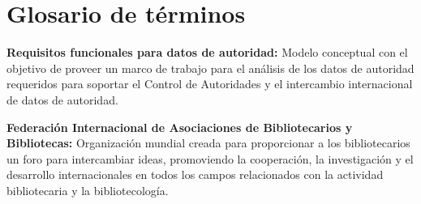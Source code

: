 \renewcommand{\appendixname}{\large Anexo}
\appendix

\chapter{\large Glosario de términos}
\pagestyle{fancy}
\lhead{}
\chead{}
\rhead{}
\lfoot{}
\cfoot{}
\rfoot{\thepage}
\renewcommand{\headrulewidth}{0.4pt}
\vspace{-1cm}

\textbf{Requisitos funcionales para datos de autoridad:} Modelo conceptual con el objetivo de proveer un marco de trabajo para el análisis de los datos de autoridad requeridos para soportar el Control de Autoridades y el intercambio internacional de datos de autoridad.

\textbf{Federación Internacional de Asociaciones de Bibliotecarios y Bibliotecas:} Organización mundial creada para proporcionar a los bibliotecarios un foro para intercambiar ideas, promoviendo la cooperación, la investigación y el desarrollo internacionales en todos los campos relacionados con la actividad bibliotecaria y la bibliotecología.





